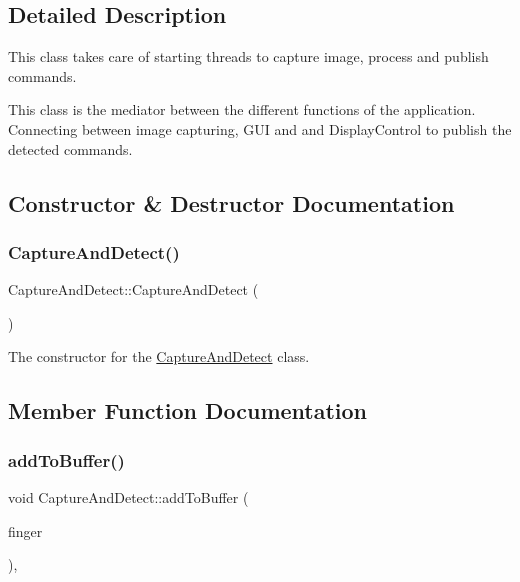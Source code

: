 \subsection{Detailed Description}
This class takes care of starting threads to capture image, process and publish commands. 

This class is the mediator between the different functions of the application. Connecting between image capturing, G\+UI and and Display\+Control to publish the detected commands. 

\subsection{Constructor \& Destructor Documentation}
\mbox{\label{classCaptureAndDetect_a26c41eaa5100975ec0f50c97592f4bf1}} 
\subsubsection{\texorpdfstring{Capture\+And\+Detect()}{CaptureAndDetect()}}
{\footnotesize\ttfamily Capture\+And\+Detect\+::\+Capture\+And\+Detect (\begin{DoxyParamCaption}{ }\end{DoxyParamCaption})}

The constructor for the \hyperlink{classCaptureAndDetect}{Capture\+And\+Detect} class. 

\subsection{Member Function Documentation}
\mbox{\label{classCaptureAndDetect_af376ab5418f7b235ee181d574da71fd6}} 
\subsubsection{\texorpdfstring{add\+To\+Buffer()}{addToBuffer()}}
{\footnotesize\ttfamily void Capture\+And\+Detect\+::add\+To\+Buffer (\begin{DoxyParamCaption}\item[{\hyperlink{classFingerAndCoordinates}{Finger\+And\+Coordinates}}]{finger }\end{DoxyParamCaption})\hspace{0.3cm}{\ttfamily [override]}, {\ttfamily [virtual]}}

